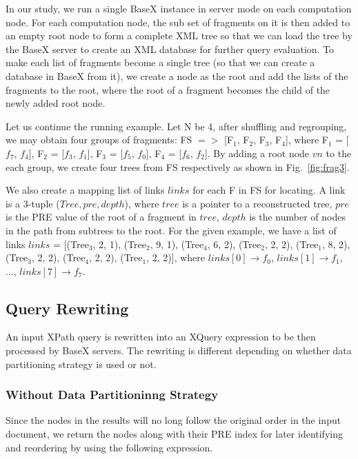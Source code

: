 In our study, we run a single BaseX instance in server mode on each computation
node. For each computation node, the sub set of fragments on it is then added to
an empty root node to form a complete XML tree so that we can load the tree by
the BaseX server to create an XML database for further query evaluation. To make
each list of fragments become a single tree (so that we can create a database in
BaseX from it),  we create a node as the root and add the lists of the fragments
to the root, where the root of a fragment becomes the child of the newly added
root node. 

Let us continue the running example. Let N be 4, after shuffling and regrouping,
we may obtain four groups of fragments: FS $=>$ [F$_1$, F$_2$, F$_3$, F$_4$], where
F$_1$ = [$f_7$, $f_4$],
F$_2$ = [$f_3$, $f_1$],
F$_3$ = [$f_5$, $f_0$],
F$_4$ = [$f_6$, $f_2$].
By adding a root node $vn$ to the each group, we create four trees from FS
respectively as shown in Fig.~\ref{fig:frag3}.

We also create a mapping list of links $links$ for each F in FS for locating.
A link is a 3-tuple ($Tree,
pre, depth$), where $tree$ is a pointer to a reconstructed tree, $pre$ is the PRE
value of the root of a fragment in $tree$, $depth$ is the number of nodes in the
path from subtrees to the root. For the given example, we have a list of links
$links$ =
[(Tree$_3$, 2, 1),
(Tree$_2$, 9, 1),
(Tree$_4$, 6, 2),
(Tree$_2$, 2, 2),
(Tree$_1$, 8, 2),
(Tree$_3$, 2, 2),
(Tree$_4$, 2, 2),
(Tree$_1$, 2, 2)],
where $links[0] \rightarrow f_0$, $links[1] \rightarrow f_1$, ...,  $links[7]
\rightarrow f_7$.

\subsection{Query Rewriting}

 
An input XPath query is rewritten into an XQuery expression to be then processed
by BaseX servers. The rewriting is different depending on whether data
partitioning strategy is used or not.

\subsubsection{Without Data Partitioninng Strategy}
\label{no-dps}

Since the nodes in the results will no long follow the original order in the
input document, we return the nodes along with their PRE index for later
identifying and reordering by using the following expression.

